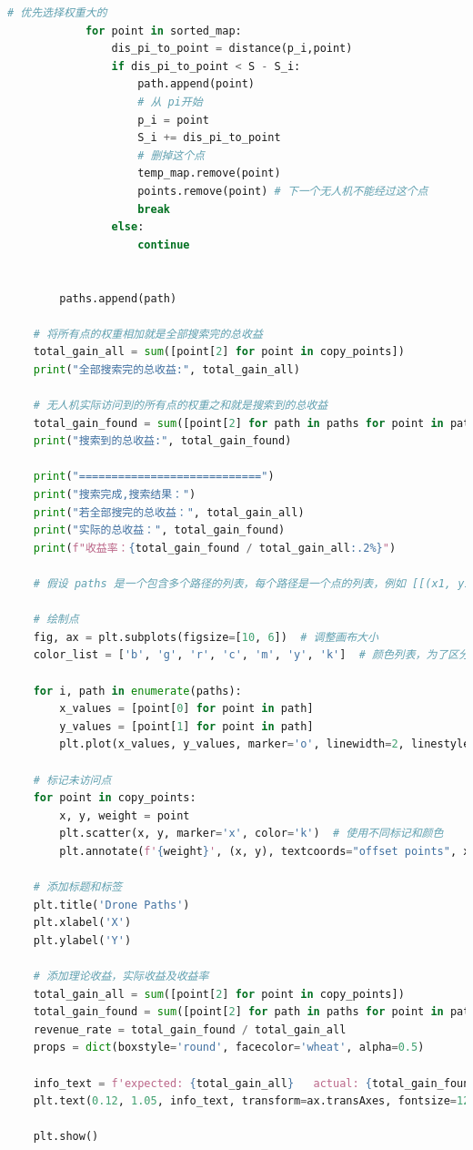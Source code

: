 \documentclass[bwprint]{gmcmthesis}
\numberwithin{figure}{section}
\begin{document}
\begin{lstlisting}[language=Python]
			# 优先选择权重大的
			for point in sorted_map:
				dis_pi_to_point = distance(p_i,point)
				if dis_pi_to_point < S - S_i:
					path.append(point)
					# 从 pi开始
					p_i = point
					S_i += dis_pi_to_point
					# 删掉这个点
					temp_map.remove(point)
					points.remove(point) # 下一个无人机不能经过这个点
					break
				else:
					continue
			
		
		paths.append(path)
	
	# 将所有点的权重相加就是全部搜索完的总收益
	total_gain_all = sum([point[2] for point in copy_points])
	print("全部搜索完的总收益:", total_gain_all)
	
	# 无人机实际访问到的所有点的权重之和就是搜索到的总收益
	total_gain_found = sum([point[2] for path in paths for point in path if len(point) > 2])
	print("搜索到的总收益:", total_gain_found)
	
	print("============================")
	print("搜索完成,搜索结果：")
	print("若全部搜完的总收益：", total_gain_all)
	print("实际的总收益：", total_gain_found)
	print(f"收益率：{total_gain_found / total_gain_all:.2%}")
	
	# 假设 paths 是一个包含多个路径的列表，每个路径是一个点的列表，例如 [[(x1, y1), (x2, y2), ...], [(x1, y1), (x2, y2), ...], ...]  
	
	# 绘制点
	fig, ax = plt.subplots(figsize=[10, 6])  # 调整画布大小
	color_list = ['b', 'g', 'r', 'c', 'm', 'y', 'k']  # 颜色列表，为了区分不同无人机的路径
	
	for i, path in enumerate(paths):
		x_values = [point[0] for point in path]
		y_values = [point[1] for point in path]
		plt.plot(x_values, y_values, marker='o', linewidth=2, linestyle='-', color=color_list[i%7])  # 使用不同颜色
	
	# 标记未访问点
	for point in copy_points:
		x, y, weight = point
		plt.scatter(x, y, marker='x', color='k')  # 使用不同标记和颜色
		plt.annotate(f'{weight}', (x, y), textcoords="offset points", xytext=(0,10), ha='center')
	
	# 添加标题和标签
	plt.title('Drone Paths')
	plt.xlabel('X')
	plt.ylabel('Y')
	
	# 添加理论收益，实际收益及收益率
	total_gain_all = sum([point[2] for point in copy_points])
	total_gain_found = sum([point[2] for path in paths for point in path if len(point) > 2])
	revenue_rate = total_gain_found / total_gain_all
	props = dict(boxstyle='round', facecolor='wheat', alpha=0.5)
	
	info_text = f'expected: {total_gain_all}   actual: {total_gain_found}   ratio: {revenue_rate:.2%}'
	plt.text(0.12, 1.05, info_text, transform=ax.transAxes, fontsize=12, horizontalalignment='center', verticalalignment='top', bbox=props)
	
	plt.show()

\end{lstlisting}
\end{document}
